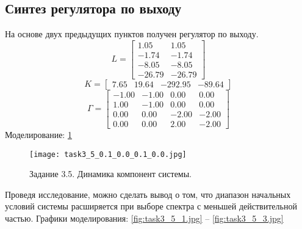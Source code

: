\subsection{Синтез регулятора по выходу}
На основе двух предыдущих пунктов получен регулятор по выходу.
\[L = \begin{bmatrix}
    1.05 &  1.05\\
   -1.74 & -1.74\\
   -8.05 & -8.05\\
   -26.79 & -26.79
  \end{bmatrix}\]
  \[K = \begin{bmatrix}
    7.65 &  19.64 & -292.95 & -89.64
  \end{bmatrix}\]
  \[\Gamma = \begin{bmatrix}
   -1.00 & -1.00 &  0.00 &  0.00\\
    1.00 & -1.00 &  0.00 &  0.00\\
    0.00 &  0.00 & -2.00 & -2.00\\
    0.00 &  0.00 &  2.00 & -2.00
  \end{bmatrix}\]
Моделирование: \ref{fig:task3_5.jpg}
\begin{figure}
        \centering
        \texttt{[image: task3\_5\_0.1\_0.0\_0.1\_0.0.jpg]}
        \caption{Задание 3.5. Динамика компонент системы.}
        \label{fig:task3_5.jpg}
\end{figure}

Проведя исследование, можно сделать вывод о том, что диапазон начальных условий системы расширяется при выборе спектра с меньшей действительной частью.
Графики моделирования: \ref{fig:task3_5_1.jpg} -- \ref{fig:task3_5_3.jpg}

